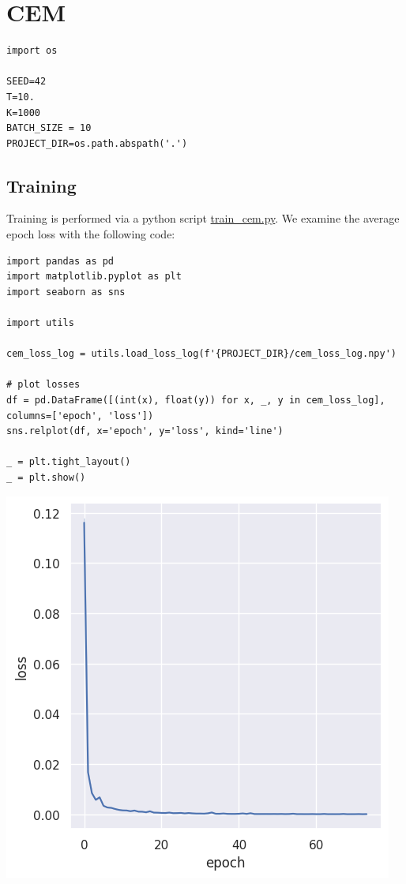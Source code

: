 \documentclass[a4paper, 11pt]{article}
\begin{document}
\section{CEM}
\label{sec:orge7a722e}
\begin{verbatim}
import os

SEED=42
T=10.
K=1000
BATCH_SIZE = 10
PROJECT_DIR=os.path.abspath('.')
\end{verbatim}
\subsection{Training}
\label{sec:orgc797b54}
Training is performed via a python script \url{train\_cem.py}. We examine the average epoch loss with the following code:
\begin{verbatim}
import pandas as pd
import matplotlib.pyplot as plt
import seaborn as sns

import utils

cem_loss_log = utils.load_loss_log(f'{PROJECT_DIR}/cem_loss_log.npy')

# plot losses
df = pd.DataFrame([(int(x), float(y)) for x, _, y in cem_loss_log], columns=['epoch', 'loss'])
sns.relplot(df, x='epoch', y='loss', kind='line')

_ = plt.tight_layout()
_ = plt.show()
\end{verbatim}

\begin{center}
\includegraphics[width=.9\linewidth]{./.ob-jupyter/08881e0d9cccd48adbf93a280496bacfad22854b.png}
\end{center}
\end{document}
